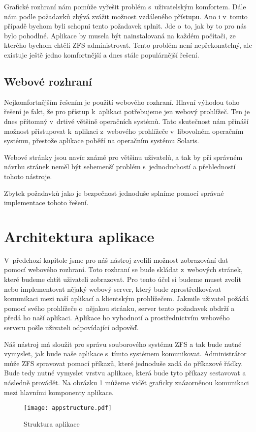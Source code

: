     Grafické rozhraní nám pomůže vyřešit problém s~uživatelským komfortem. Dále nám podle požadavků zbývá zvážit možnost vzdáleného přístupu. Ano i v~tomto případě bychom byli schopni tento požadavek splnit. Jde o~to, jak by to pro nás bylo pohodlné. Aplikace by musela být nainstalovaná na každém počítači, ze kterého bychom chtěli ZFS administrovat. Tento problém není nepřekonatelný, ale existuje ještě jedno komfortnější a dnes stále populárnější řešení.
    \subsection{Webové rozhraní}
    Nejkomfortnějším řešením je použití webového rozhraní. Hlavní výhodou toho řešení je fakt, že pro přístup k~aplikaci potřebujeme jen webový prohlížeč. Ten je dnes přítomný v~drtivé většině operačních systémů. Tato skutečnost nám přináší možnost přistupovat k~aplikaci z~webového prohlížeče v~libovolném operačním systému, přestože aplikace poběží na operačním systému Solaris.

    Webové stránky jsou navíc známé pro většinu uživatelů, a tak by při správném návrhu stránek neměl být sebemenší problém s~jednoduchostí a přehledností tohoto nástroje.

    Zbytek požadavků jako je bezpečnost jednoduše splníme pomocí správné implementace tohoto řešení.
\section{Architektura aplikace}
V~předchozí kapitole jsme pro náš nástroj zvolili možnost zobrazování dat pomocí webového rozhraní. Toto rozhraní se bude skládat z~webových stránek, které budeme chtít uživateli zobrazovat. Pro tento účel si budeme muset zvolit nebo implementovat nějaký webový server, který bude zprostředkovávat komunikaci mezi naší aplikací a klientským prohlížečem. Jakmile uživatel požádá pomocí svého prohlížeče o~nějakou stránku, server tento požadavek obdrží a předá ho naší aplikaci. Aplikace ho vyhodnotí a prostřednictvím webového serveru pošle uživateli odpovídající odpověď.

Náš nástroj má sloužit pro správu souborového systému ZFS a tak bude nutné vymyslet, jak bude naše aplikace s~tímto systémem komunikovat. Administrátor může ZFS spravovat pomocí příkazů, které jednoduše zadá do příkazové řádky. Bude tedy nutné vymyslet vrstvu aplikace, která bude tyto příkazy sestavovat a následně provádět. Na obrázku \ref{architecture} můžeme vidět graficky znázorněnou komunikaci mezi hlavními komponenty aplikace.
\begin{figure}[h]
        \centering
        \texttt{[image: appstructure.pdf]}
        \caption{Struktura aplikace}
        \label{architecture}
\end{figure}
